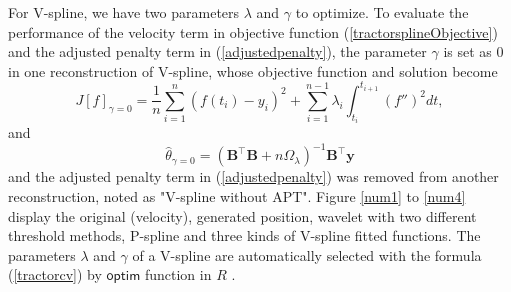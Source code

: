 For V-spline, we have two parameters $\lambda$ and $\gamma$ to optimize. To evaluate the performance of the velocity term in objective function (\ref{tractorsplineObjective}) and the adjusted penalty term in (\ref{adjustedpenalty}), the parameter $\gamma$ is set as 0 in one reconstruction of V-spline, whose objective function and solution become
\begin{equation}\label{ofgamma0}
J[f]_{\gamma=0}= \frac{1}{n} \sum_{i=1}^{n} \left(f(t_i)-y_i\right)^2 +\sum_{i=1}^{n-1} \lambda_i\int_{t_i}^{t_{i+1}} \left(f''\right)^2 dt,
\end{equation}
and
\begin{equation}\label{thetahat0}
\hat{\theta}_{\gamma=0}=\left(\mathbf{B}^\top\mathbf{B}+n\Omega_{\lambda}\right)^{-1}\mathbf{B}^\top\mathbf{y}
\end{equation}
and the adjusted penalty term in (\ref{adjustedpenalty}) was removed from another reconstruction, noted as "V-spline without APT". Figure \ref{num1} to \ref{num4} display the original (velocity), generated position, wavelet with two different threshold methods, P-spline and three kinds of V-spline fitted functions. The parameters $\lambda$ and $\gamma$ of a V-spline are automatically selected with the formula (\ref{tractorcv}) by $\textsf{optim}$ function in $R$ \citep{nelder1965simplex}.



